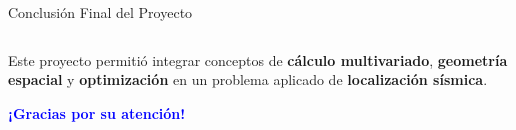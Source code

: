 \begin{frame}{Conclusión Final del Proyecto}
\begin{columns}[T]
    \end{columns}

    \vspace{0.3cm}

    \begin{block}{}
        \centering
        \normalsize
        Este proyecto permitió integrar conceptos de \textbf{cálculo multivariado},
        \textbf{geometría espacial} y \textbf{optimización} en un problema aplicado
        de \textbf{localización sísmica}.
    \end{block}

    \vspace{0.2cm}
    \begin{center}
        \footnotesize
        \textbf{\textcolor{blue}{¡Gracias por su atención!}}
    \end{center}

\end{frame}